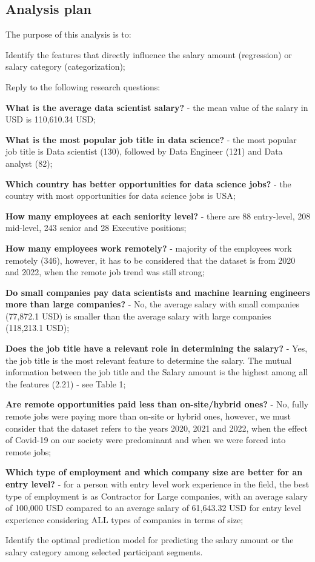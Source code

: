 \documentclass[11pt,a4paper]{article}
\newcommand{\SubItem}[1]{
  {\setlength\itemindent{13pt} \item[◦] #1}
}
\begin{document}
\subsection{Analysis plan} 
The purpose of this analysis is to:
\begin{itemize}
\item Identify the features that directly influence the salary amount (regression) or salary category (categorization);
\item Reply to the following research questions:
\SubItem{\textbf{What is the average data scientist salary?} - the mean value of the salary in USD is 110,610.34 USD;}
\SubItem{\textbf{What is the most popular job title in data science?} - the most popular job title is Data scientist (130), followed by Data Engineer (121) and Data analyst (82);}
\SubItem{\textbf{Which country has better opportunities for data science jobs?} - the country with most opportunities for data science jobs is USA;}
\SubItem{\textbf{How many employees at each seniority level?} - there are 88 entry-level, 208 mid-level, 243 senior and 28 Executive positions;}
\SubItem{\textbf{How many employees work remotely?} -  majority of the employees work remotely (346), however, it has to be considered that the dataset is from 2020 and 2022, when the remote job trend was still strong;}
\SubItem{\textbf{Do small companies pay data scientists and machine learning engineers more than large companies?} - No, the average salary with small companies (77,872.1 USD) is smaller than the average salary with large companies (118,213.1 USD);}
\SubItem{\textbf{Does the job title have a relevant role in determining the salary?} - Yes, the job title is the most relevant feature to determine the salary. The mutual information between the job title and the Salary amount is the highest among all the features (2.21) - see Table 1;}
\SubItem{\textbf{Are remote opportunities paid less than on-site/hybrid ones?} - No, fully remote jobs were paying more than on-site or hybrid ones, however, we must consider that the dataset refers to the years 2020, 2021 and 2022, when the effect of Covid-19 on our society were predominant and when we were forced into remote jobs;}
\SubItem{\textbf{Which type of employment and which company size are better for an entry level?} - for a person with entry level work experience in the field, the best type of employment is as Contractor for Large companies, with an average salary of 100,000 USD compared to an average salary of 61,643.32 USD for entry level experience considering ALL types of companies in terms of size;}
\item Identify the optimal prediction model for predicting the salary amount or the salary category among selected participant segments.
\end{itemize}
\end{document}
